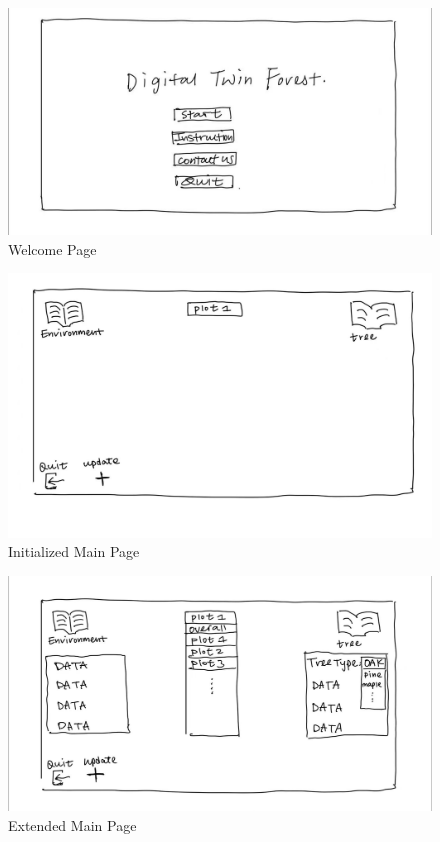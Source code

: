 \documentclass[12pt, titlepage]{article}
\begin{document}
\begin{figure}[H]
    \centering
    \includegraphics[scale=0.3]{SysDesPic/AppendixA-1.jpeg}
    \caption{Welcome Page}
\end{figure}

\begin{figure}[H]
    \centering
    \includegraphics[scale=0.3]{SysDesPic/AppendixA-2.jpeg}
    \caption{Initialized Main Page}
\end{figure}

\begin{figure}[H]
    \centering
    \includegraphics[scale=0.3]{SysDesPic/AppendixA-3.jpeg}
    \caption{Extended Main Page}
\end{figure}
\end{document}
